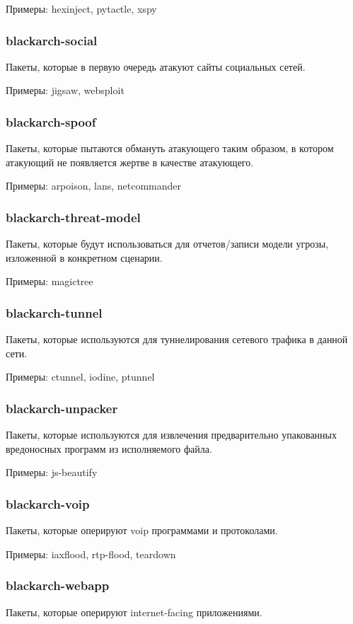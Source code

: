 \documentclass[a4paper, oneside, 11pt]{book}
\begin{document}
Примеры: hexinject, pytactle, xspy

\subsubsection{blackarch-social}
Пакеты, которые в первую очередь атакуют сайты социальных сетей.

Примеры: jigsaw, websploit

\subsubsection{blackarch-spoof}
Пакеты, которые пытаются обмануть атакующего таким образом,
в котором атакующий не появляется жертве в качестве атакующего.

Примеры: arpoison, lans, netcommander

\subsubsection{blackarch-threat-model}
Пакеты, которые будут использоваться для отчетов/записи 
модели угрозы, изложенной в конкретном сценарии.

Примеры: magictree

\subsubsection{blackarch-tunnel}
Пакеты, которые используются для туннелирования 
сетевого трафика в данной сети.

Примеры: ctunnel, iodine, ptunnel

\subsubsection{blackarch-unpacker}
Пакеты, которые используются для извлечения предварительно 
упакованных вредоносных программ из исполняемого файла.

Примеры: js-beautify

\subsubsection{blackarch-voip}
Пакеты, которые оперируют voip программами и протоколами.

Примеры: iaxflood, rtp-flood, teardown

\subsubsection{blackarch-webapp}
Пакеты, которые оперируют internet-facing приложениями.
\end{document}
